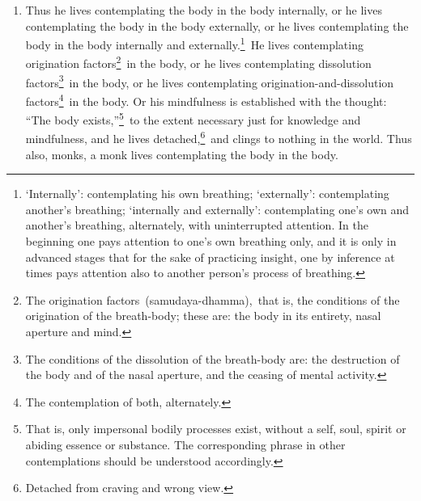 \documentclass[a4 paper, 12pt]{article}
\begin{document}
\begin{multicols}{2}
\begin{enumerate}[resume]
\item Thus he lives contemplating the body in the body internally, or he lives contemplating the body in the body externally, or he lives contemplating the body in the body internally and externally.\footnote{‘Internally’: contemplating his own breathing; ‘externally’: contemplating another’s breathing; ‘internally and externally’: contemplating one’s own and another’s breathing, alternately, with uninterrupted attention. In the beginning one pays attention to one’s own breathing only, and it is only in advanced stages that for the sake of practicing insight, one by inference at times pays attention also to another person’s process of breathing.} He lives contemplating origination factors\footnote{The origination factors (samudaya-dhamma), that is, the conditions of the origination of the breath-body; these are: the body in its entirety, nasal aperture and mind.} in the body, or he lives contemplating dissolution factors\footnote{The conditions of the dissolution of the breath-body are: the destruction of the body and of the nasal aperture, and the ceasing of mental activity.} in the body, or he lives contemplating origination-and-dissolution factors\footnote{The contemplation of both, alternately.} in the body. Or his mindfulness is established with the thought: “The body exists,”\footnote{That is, only impersonal bodily processes exist, without a self, soul, spirit or abiding essence or substance. The corresponding phrase in other contemplations should be understood accordingly.} to the extent necessary just for knowledge and mindfulness, and he lives detached,\footnote{Detached from craving and wrong view.} and clings to nothing in the world. Thus also, monks, a monk lives contemplating the body in the body.
\end{enumerate}

\end{multicols}
\end{document}
